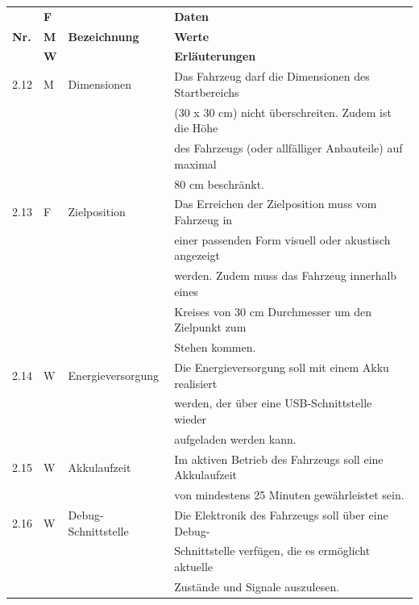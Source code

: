 \documentclass[../main.tex]{subfiles}
\begin{document}
\begin{tabular}{|l|l|l|l|}
  \hline
  & \textbf{F} & & \textbf{Daten} \\
  \textbf{Nr.} & \textbf{M} & \textbf{Bezeichnung} & \textbf{Werte} \\
  & \textbf{W} & & \textbf{Erläuterungen} \\
  \hline
  2.12 & M & Dimensionen & Das Fahrzeug darf die Dimensionen des
  Startbereichs \\
  & & & (30 x 30 cm) nicht überschreiten. Zudem ist die Höhe \\
  & & & des Fahrzeugs (oder allfälliger Anbauteile) auf maximal \\
  & & & 80 cm beschränkt. \\
  \hline
  2.13 & F & Zielposition & Das Erreichen der Zielposition muss vom
  Fahrzeug in \\
  & & & einer passenden Form visuell oder akustisch angezeigt \\
  & & & werden. Zudem muss das Fahrzeug innerhalb eines \\
  & & & Kreises von 30 cm Durchmesser um den Zielpunkt zum \\
  & & & Stehen kommen. \\
  \hline
  2.14 & W & Energieversorgung & Die Energieversorgung soll mit einem
  Akku realisiert \\
  & & & werden, der über eine USB-Schnittstelle wieder \\
  & & & aufgeladen werden kann. \\
  \hline
  2.15 & W & Akkulaufzeit & Im aktiven Betrieb des Fahrzeugs soll
  eine Akkulaufzeit \\
  & & & von mindestens 25 Minuten gewährleistet sein. \\
  \hline
  2.16 & W & Debug-Schnittstelle & Die Elektronik des Fahrzeugs soll
  über eine Debug- \\
  & & & Schnittstelle verfügen, die es ermöglicht aktuelle \\
  & & & Zustände und Signale auszulesen. \\
  \hline
\end{tabular}
\end{document}
